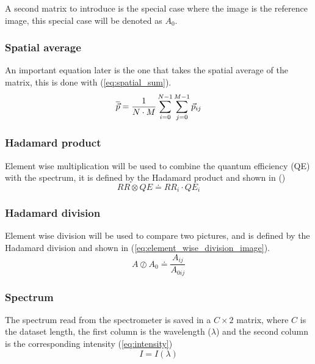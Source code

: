 A second matrix to introduce is the special case where the image is the reference image, this special case will be denoted as $A_0$.

\subsubsection{Spatial average}
\label{sec:spatial_average}

An important equation later is the one that takes the spatial average of the matrix, this is done with (\ref{eq:spatial_sum}).
\begin{equation}
    \label{eq:spatial_sum}
    \overline{\vec{p}} = \frac{1}{N \cdot M} \sum_{i=0}^{N-1} \sum_{j=0}^{M-1} \vec{p}_{ij}
\end{equation}

\subsubsection{Hadamard product}
\label{sec:hadamard_product}
Element wise multiplication will be used to combine the quantum efficiency (QE) with the spectrum, it is defined by the Hadamard product \cite{millionIntroductionBasicResults} and shown in ()
\begin{equation}
    \label{eq:element_wise_product_spectrum}
    RR \otimes QE \doteq RR_i \cdot QE_i
\end{equation}

\subsubsection{Hadamard division}
\label{sec:hadamard_division}
Element wise division will be used to compare two pictures, and is defined by the Hadamard division \cite{HadamardDivisionInfixed} and shown in (\ref{eq:element_wise_division_image}).
\begin{equation}
    \label{eq:element_wise_division_image}
    A \oslash  A_0 \doteq  \frac{A_{ij}}{A_{0ij} } %
\end{equation}


\subsubsection{Spectrum}
\label{sec:spectrum}

The spectrum read from the spectrometer is saved in a $C \times 2$ matrix, where $C$ is the dataset length, the first column is the wavelength ($\lambda$) and the second column is the corresponding intensity (\ref{eq:intensity})
\begin{equation}
    \label{eq:intensity}
    I = I(\lambda)    
\end{equation}

